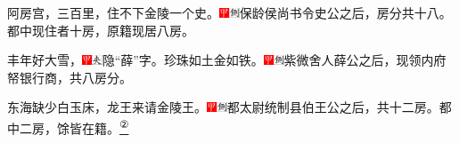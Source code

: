 阿房宫，三百里，住不下金陵一个史。{\includegraphics[width=3mm]{../Images/00002}\includegraphics[width=3mm]{../Images/00011}\footnotesize \kaishu 保龄侯尚书令史公之后，房分共十八。都中现住者十房，原籍现居八房。}

丰年好大雪，{\includegraphics[width=3mm]{../Images/00002}\includegraphics[width=3mm]{../Images/00012}\footnotesize \kaishu 隐``薛''字。}珍珠如土金如铁。{\includegraphics[width=3mm]{../Images/00002}\includegraphics[width=3mm]{../Images/00011}\footnotesize \kaishu 紫微舍人薛公之后，现领内府帑银行商，共八房分。}

东海缺少白玉床，龙王来请金陵王。{\includegraphics[width=3mm]{../Images/00002}\includegraphics[width=3mm]{../Images/00011}\footnotesize \kaishu 都太尉统制县伯王公之后，共十二房。都中二房，馀皆在籍。}\href{../Text/part0008_split_000.html\#lnkback_2_a}{\textsuperscript{②}}

